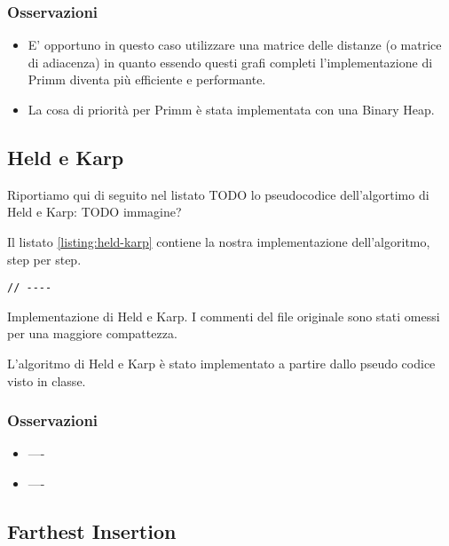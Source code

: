 \subsubsection{Osservazioni}

\begin{itemize}
    \item E' opportuno in questo caso utilizzare una matrice delle distanze (o matrice di adiacenza) in quanto essendo questi grafi completi l'implementazione di Primm diventa più efficiente e performante.
    \item La cosa di priorità per Primm è stata implementata con una Binary Heap.
\end{itemize}


\subsection{Held e Karp}

Riportiamo qui di seguito nel listato TODO lo pseudocodice dell'algortimo di Held e Karp:
TODO immagine?

\noindent Il listato \ref{listing:held-karp} contiene la nostra implementazione dell'algoritmo, step per step.

\begin{listing}[!ht]
\begin{verbatim}
// ----

\end{verbatim}
\caption{Implementazione di Held e Karp. I commenti del file originale sono stati omessi per una maggiore compattezza.}
\label{listing:held-karp}
\end{listing}

\noindent L'algoritmo di Held e Karp è stato implementato a partire dallo pseudo codice visto in classe. \\

\subsubsection{Osservazioni}

\begin{itemize}
    \item ----\\

    \item ----\\

\end{itemize}


\subsection{Farthest Insertion}

